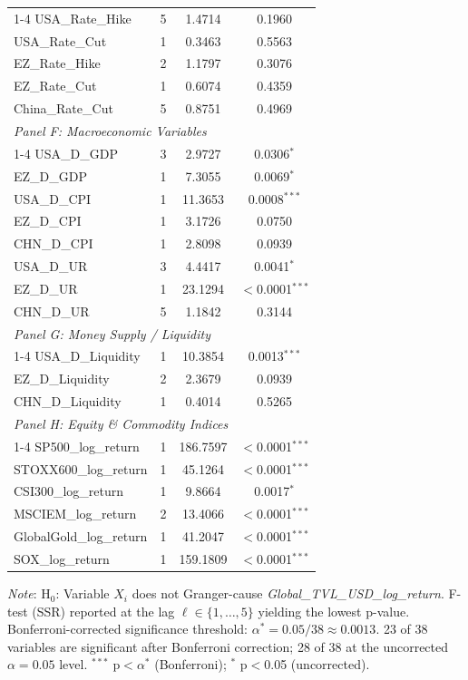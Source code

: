 {\begin{tabular}{lccc}
    \cmidrule(lr){1-4}
    USA\_Rate\_Hike & 5 & 1.4714 & 0.1960 \\ 
    USA\_Rate\_Cut & 1 & 0.3463 & 0.5563 \\ 
    EZ\_Rate\_Hike & 2 & 1.1797 & 0.3076 \\ 
    EZ\_Rate\_Cut & 1 & 0.6074 & 0.4359 \\ 
    China\_Rate\_Cut & 5 & 0.8751 & 0.4969 \\ 
    \midrule
    \multicolumn{4}{l}{\textit{Panel F: Macroeconomic Variables}} \\ 
    \cmidrule(lr){1-4}
    USA\_D\_GDP & 3 & 2.9727 & 0.0306$^{*}$ \\ 
    EZ\_D\_GDP & 1 & 7.3055 & 0.0069$^{*}$ \\ 
    USA\_D\_CPI & 1 & 11.3653 & 0.0008$^{***}$ \\ 
    EZ\_D\_CPI & 1 & 3.1726 & 0.0750 \\ 
    CHN\_D\_CPI & 1 & 2.8098 & 0.0939 \\ 
    USA\_D\_UR & 3 & 4.4417 & 0.0041$^{*}$ \\ 
    EZ\_D\_UR & 1 & 23.1294 & $<$0.0001$^{***}$ \\ 
    CHN\_D\_UR & 5 & 1.1842 & 0.3144 \\ 
    \midrule
    \multicolumn{4}{l}{\textit{Panel G: Money Supply / Liquidity}} \\ 
    \cmidrule(lr){1-4}
    USA\_D\_Liquidity & 1 & 10.3854 & 0.0013$^{***}$ \\ 
    EZ\_D\_Liquidity & 2 & 2.3679 & 0.0939 \\ 
    CHN\_D\_Liquidity & 1 & 0.4014 & 0.5265 \\ 
    \midrule
    \multicolumn{4}{l}{\textit{Panel H: Equity \& Commodity Indices}} \\ 
    \cmidrule(lr){1-4}
    SP500\_log\_return & 1 & 186.7597 & $<$0.0001$^{***}$ \\ 
    STOXX600\_log\_return & 1 & 45.1264 & $<$0.0001$^{***}$ \\ 
    CSI300\_log\_return & 1 & 9.8664 & 0.0017$^{*}$ \\ 
    MSCIEM\_log\_return & 2 & 13.4066 & $<$0.0001$^{***}$ \\ 
    GlobalGold\_log\_return & 1 & 41.2047 & $<$0.0001$^{***}$ \\ 
    SOX\_log\_return & 1 & 159.1809 & $<$0.0001$^{***}$ \\ 
    \bottomrule
  \end{tabular}}
\par\vspace{4pt}
\begin{minipage}{\linewidth}
  \footnotesize \textit{Note}: H$_0$: Variable $X_i$ does not Granger-cause \textit{Global\_TVL\_USD\_log\_return}. F-test (SSR) reported at the lag $\ell \in \{1, \dots, 5\}$ yielding the lowest p-value. Bonferroni-corrected significance threshold: $\alpha^* = 0.05 / 38 \approx 0.0013$. 23 of 38 variables are significant after Bonferroni correction; 28 of 38 at the uncorrected $\alpha = 0.05$ level. $^{***}$ p$<\alpha^*$ (Bonferroni); $^{*}$ p$<$0.05 (uncorrected).
\end{minipage}